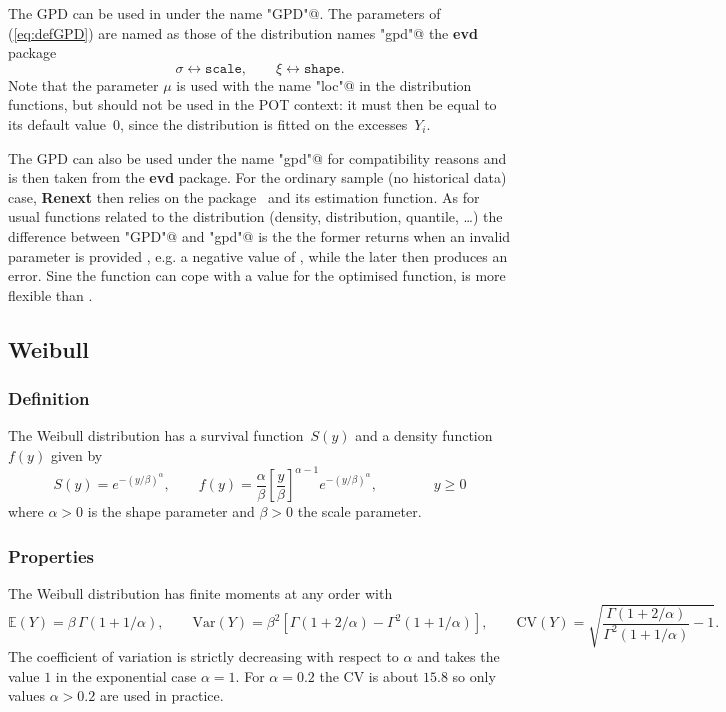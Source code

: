 \documentclass[a4paper]{report}
\newcommand{\pkg}[1]{\textbf{#1}}
\newcommand{\Esp}{\mathbb{E}}
\newcommand{\Var}{\textrm{Var}}
\begin{document}
The GPD can be used in \verb@Renouv@ under the name \verb@"GPD"@. The 
parameters of (\ref{eq:defGPD}) are named as those of the distribution
names \verb@"gpd"@ the \pkg{evd} package
$$
   \sigma \leftrightarrow \texttt{scale}, \qquad \xi \leftrightarrow \texttt{shape}.
$$
Note that the parameter $\mu$ is used with the name \verb@"loc"@ in the 
distribution functions, but should not be used in the POT context: 
it must then be equal to its default value~$0$, since the distribution is
fitted on the excesses~$Y_i$.

The GPD can also be used under the name \verb@"gpd"@ for compatibility reasons
and is then taken from the \pkg{evd} package. For the ordinary sample (no
historical data) case, \textbf{Renext} then relies on the \verb@evd@
package~\citep{PACKevd} and its \verb@fpot@ estimation function. As
for usual functions related to the distribution (density, distribution, quantile, \dots)
the difference between \verb@"GPD"@ and \verb@"gpd"@ is the the former returns
\verb@NaN@ when an invalid parameter is provided , e.g. a negative value of \verb@scale@,
while the later then produces an error. Sine the \verb@optim@ function can cope with 
a \verb@NaN@ value for the optimised function, \verb@GPD@ is more flexible 
than \verb@gpd@.

\subsection{Weibull}

\subsubsection*{Definition}
The Weibull distribution has a survival function~$S(y)$ and a density function~$f(y)$ given by 
\begin{equation}
  \label{eq:defWeibull}
    S(y) =  e^{-\left(y/\beta\right)^\alpha}, \qquad
  f(y) = \frac{\alpha}{\beta} \left[\frac{y}{\beta}\right]^{\alpha-1} 
  e^{-\left(y/\beta\right)^\alpha}, \qquad
  \qquad y \geqslant 0
\end{equation}
where $\alpha>0$ is the shape parameter and $\beta>0$ the scale 
parameter. 

\subsubsection*{Properties}
The Weibull distribution has finite moments at any order with
$$
  \Esp(Y) = \beta \, \Gamma(1 + 1/\alpha), \qquad
  \Var(Y) = \beta^2 \left[\Gamma(1 + 2/\alpha) - \Gamma^2(1 + 1/\alpha)\right], \qquad
  \textrm{CV}(Y) = \sqrt{\frac{\Gamma(1 + 2/\alpha)}{\Gamma^2(1 + 1/\alpha)} - 1}.
$$
The coefficient of variation is strictly decreasing with respect 
to $\alpha$ and takes the value $1$ in the exponential case $\alpha = 1$.
For $\alpha = 0.2$ the CV is about $15.8$ so only values $\alpha > 0.2$
are used in practice.
\end{document}
